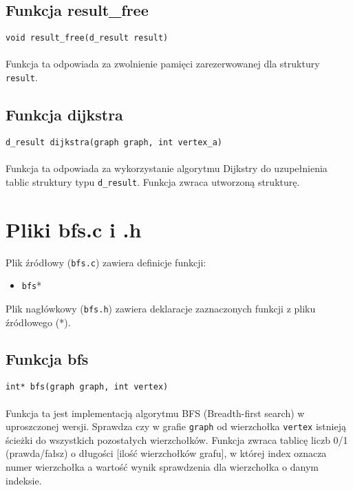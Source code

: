 \documentclass[11pt,a4paper]{report}
\begin{document}
    \subsection{Funkcja result\_free}
    \verb|void result_free(d_result result)|\\
    \\
    Funkcja ta odpowiada za zwolnienie pamięci zarezerwowanej dla struktury \verb|result|.\\
    \subsection{Funkcja dijkstra}
    \verb|d_result dijkstra(graph graph, int vertex_a)|\\
    \\
    Funkcja ta odpowiada za wykorzystanie algorytmu Dijkstry do uzupełnienia tablic struktury typu \verb|d_result|. Funkcja zwraca utworzoną strukturę.\\

    \newpage
    \section{Pliki bfs.c i .h}
    Plik źródłowy (\verb|bfs.c|) zawiera definicje funkcji:
    \begin{itemize}
        \item \verb|bfs|*
    \end{itemize}
    Plik nagłówkowy (\verb|bfs.h|) zawiera deklaracje zaznaczonych funkcji z pliku źródłowego (*).\\
    \subsection{Funkcja bfs}
    \verb|int* bfs(graph graph, int vertex)|\\
    \\
    Funkcja ta jest implementacją algorytmu BFS (Breadth-first search) w uproszczonej wersji. Sprawdza czy w grafie \verb|graph| od wierzchołka \verb|vertex| istnieją ścieżki do wszystkich pozostałych wierzchołków. Funkcja zwraca tablicę liczb 0/1 (prawda/fałsz) o długości [ilość wierzchołków grafu], w której index oznacza numer wierzchołka a wartość wynik sprawdzenia dla wierzchołka o danym indeksie.\\

    \newpage
\end{document}

